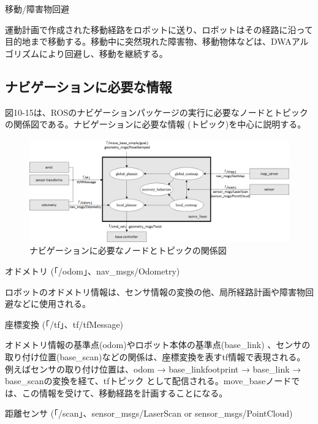 \circled{\thenum} 移動/障害物回避

運動計画で作成された移動経路をロボットに送り、ロボットはその経路に沿って目的地まで移動する。移動中に突然現れた障害物、移動物体などは、DWAアルゴリズムにより回避し、移動を継続する。

\subsection{ナビゲーションに必要な情報}

図10-15は、ROSのナビゲーションパッケージの実行に必要なノードとトピックの関係図である。ナビゲーションに必要な情報 (トピック)を中心に説明する。

\begin{figure}[htp]
  \centering
  \includegraphics[width=\columnwidth]{pictures/chapter10/pic_10_15.png}
  \caption{ナビゲーションに必要なノードとトピックの関係図}
\end{figure}

\setcounter{num}{0}

\circled{\thenum} オドメトリ (「/odom」、nav\_msgs/Odometry)

ロボットのオドメトリ情報は、センサ情報の変換の他、局所経路計画や障害物回避などに使用される。

\circled{\thenum} 座標変換 (「/tf」、tf/tfMessage)

オドメトリ情報の基準点(odom)やロボット本体の基準点(base\_link)  、センサの取り付け位置(base\_scan)などの関係は、座標変換を表すtf情報で表現される。例えばセンサの取り付け位置は、odom → base\_linkfootprint → base\_link → base\_scanの変換を経て、tfトピック  として配信される。move\_baseノードでは、この情報を受けて、移動経路を計画することになる。

\circled{\thenum} 距離センサ (「/scan」、sensor\_msgs/LaserScan or sensor\_msgs/PointCloud)

